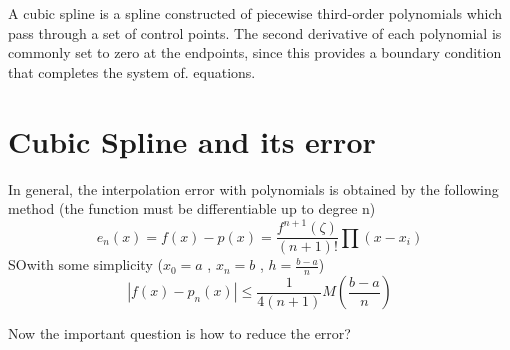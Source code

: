 \documentclass[12pt]{article}
\begin{document}
A cubic spline is a spline constructed of piecewise third-order polynomials which pass through a set of control points. The second derivative of each polynomial is commonly set to zero at the endpoints, since this provides a boundary condition that completes the system of. equations.
\section{Cubic Spline and its error}
In general, the interpolation error with polynomials is obtained by the following method (the function must be differentiable up to degree n) \\
\begin{equation}
e_n(x) = f(x) - p(x) = \frac{f^{n+1}(\zeta)}{(n+1)!} \prod (x-x_i)
\end{equation}
SOwith some simplicity ($x_0 = a$ , $x_n = b$ , $h = \frac{b-a}{n}$)\\
\begin{equation}
|f(x) - p_n(x)| \le \frac{1}{4(n+1)}M(\frac{b-a}{n})
\end{equation}

Now the important question is how to reduce the error?
\end{document}
